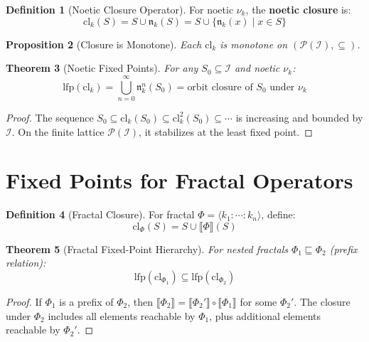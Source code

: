 \documentclass[11pt,twoside,openright]{book}
\theoremstyle{definition}
\newtheorem{definition}{Definition}[chapter]
\theoremstyle{plain}
\newtheorem{theorem}[definition]{Theorem}
\newtheorem{proposition}[definition]{Proposition}
\theoremstyle{remark}
\newcommand{\sem}[1]{\llbracket #1 \rrbracket}
\newcommand{\Ideas}{\mathcal{I}}
\newcommand{\noe}[1]{\nu_{#1}}
\newcommand{\Frac}{\Phi}
\begin{document}
\begin{definition}[Noetic Closure Operator]
\label{def:noetic-closure}
For noetic $\noe{k}$, the \textbf{noetic closure} is:
\[
\mathrm{cl}_k(S) = S \cup \mathfrak{n}_k(S) = S \cup \{\mathfrak{n}_k(x) \mid x \in S\}
\]
\end{definition}

\begin{proposition}[Closure is Monotone]
\label{prop:closure-monotone}
Each $\mathrm{cl}_k$ is monotone on $(\mathcal{P}(\Ideas), \subseteq)$.
\end{proposition}

\begin{theorem}[Noetic Fixed Points]
\label{thm:noetic-fixed-points}
For any $S_0 \subseteq \Ideas$ and noetic $\noe{k}$:
\[
\mathrm{lfp}(\mathrm{cl}_k) = \bigcup_{n=0}^\infty \mathfrak{n}_k^n(S_0) = \text{orbit closure of } S_0 \text{ under } \noe{k}
\]
\end{theorem}

\begin{proof}
The sequence $S_0 \subseteq \mathrm{cl}_k(S_0) \subseteq \mathrm{cl}_k^2(S_0) \subseteq \cdots$ is increasing and bounded by $\Ideas$. On the finite lattice $\mathcal{P}(\Ideas)$, it stabilizes at the least fixed point.
\end{proof}

\section{Fixed Points for Fractal Operators}

\begin{definition}[Fractal Closure]
\label{def:fractal-closure}
For fractal $\Frac = \langle k_1 : \cdots : k_n \rangle$, define:
\[
\mathrm{cl}_\Frac(S) = S \cup \sem{\Frac}(S)
\]
\end{definition}

\begin{theorem}[Fractal Fixed-Point Hierarchy]
\label{thm:fractal-fixed-hierarchy}
For nested fractals $\Frac_1 \sqsubseteq \Frac_2$ (prefix relation):
\[
\mathrm{lfp}(\mathrm{cl}_{\Frac_1}) \subseteq \mathrm{lfp}(\mathrm{cl}_{\Frac_2})
\]
\end{theorem}

\begin{proof}
If $\Frac_1$ is a prefix of $\Frac_2$, then $\sem{\Frac_2} = \sem{\Frac_2'} \circ \sem{\Frac_1}$ for some $\Frac_2'$. The closure under $\Frac_2$ includes all elements reachable by $\Frac_1$, plus additional elements reachable by $\Frac_2'$.
\end{proof}
\end{document}
